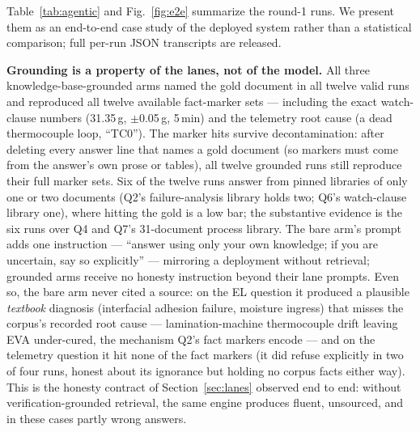 Table~\ref{tab:agentic} and Fig.~\ref{fig:e2e} summarize the round-1 runs.
We present them as an end-to-end case study of the deployed system rather
than a statistical comparison; full per-run JSON transcripts are released.

\textbf{Grounding is a property of the lanes, not of the model.} All three
knowledge-base-grounded arms named the gold document in all twelve valid
runs and reproduced all twelve available fact-marker sets --- including the
exact watch-clause numbers (31.35\,g, $\pm$0.05\,g, 5\,min) and the
telemetry root cause (a dead thermocouple loop, ``TC0''). The marker hits
survive decontamination: after deleting every answer line that names a
gold document (so markers must come from the answer's own prose or
tables), all twelve grounded runs still reproduce their full marker sets.
Six of the twelve runs answer from pinned libraries of only one or two
documents (Q2's failure-analysis library holds two; Q6's watch-clause
library one), where hitting the gold is a low bar; the substantive
evidence is the six runs over Q4 and Q7's 31-document process library.
The bare arm's prompt adds one instruction --- ``answer using only your
own knowledge; if you are uncertain, say so explicitly'' --- mirroring a
deployment without retrieval; grounded arms receive no honesty
instruction beyond their lane prompts. Even so, the bare arm
never cited a source: on the EL question it produced a plausible
\emph{textbook} diagnosis (interfacial adhesion failure, moisture ingress)
that misses the corpus's recorded root cause --- lamination-machine
thermocouple drift leaving EVA under-cured, the mechanism Q2's fact
markers encode --- and on the telemetry question it hit none of the fact
markers (it did refuse explicitly in two of four runs, honest about its
ignorance but holding no corpus facts either way).
This is the honesty contract of Section~\ref{sec:lanes} observed end to
end: without verification-grounded retrieval, the same engine produces
fluent, unsourced, and in these cases partly wrong answers.

